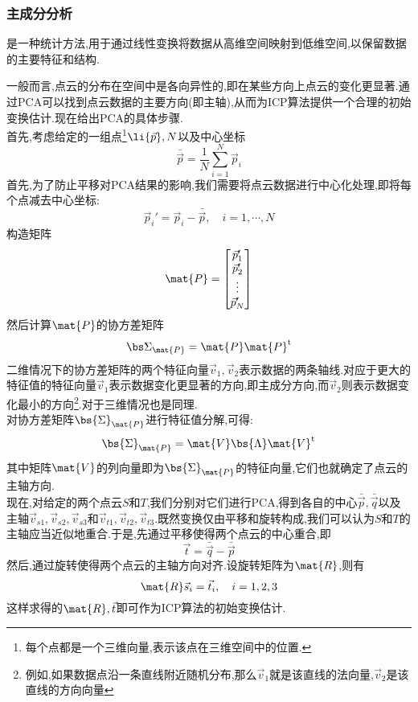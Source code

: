 \documentclass{ctexart}
\begin{document}
\subsubsection{主成分分析}
\begin{definition}[主成分分析]
    是一种统计方法,用于通过线性变换将数据从高维空间映射到低维空间,以保留数据的主要特征和结构.
\end{definition}
一般而言,点云的分布在空间中是各向异性的,即在某些方向上点云的变化更显著.通过PCA可以找到点云数据的主要方向(即主轴),从而为ICP算法提供一个合理的初始变换估计.现在给出PCA的具体步骤.\\
\indent 首先,考虑给定的一组点\footnote{每个点都是一个三维向量,表示该点在三维空间中的位置.}$\li{\vec p},N$以及中心坐标
\[\bar{\vec{p}}=\dfrac1N\sum_{i=1}^{N}\vec{p}_i\]
首先,为了防止平移对PCA结果的影响,我们需要将点云数据进行中心化处理,即将每个点减去中心坐标:
\[\vec{p}_i'=\vec{p}_i-\bar{\vec{p}},\quad i=1,\cdots,N\]
构造矩阵
\[\mat{P}=\begin{bmatrix}
    \vec{p}_1'\\\vec{p}_2'\\\vdots\\\vec{p}_N'
\end{bmatrix}\]
然后计算$\mat{P}$的协方差矩阵
\[\bs\Sigma_{\mat{P}}=\mat{P}\mat{P}^{\text{t}}\]
二维情况下的协方差矩阵的两个特征向量$\vec{v}_1,\vec{v}_2$表示数据的两条轴线.对应于更大的特征值的特征向量$\vec{v}_1$表示数据变化更显著的方向,即主成分方向,而$\vec{v}_2$则表示数据变化最小的方向\footnote{例如,如果数据点沿一条直线附近随机分布,那么$\vec{v}_1$就是该直线的法向量,$\vec{v}_2$是该直线的方向向量}.对于三维情况也是同理.\\
\indent 对协方差矩阵$\bs{\Sigma}_{\mat{P}}$进行特征值分解,可得:
\[\bs{\Sigma}_{\mat{P}}=\mat{V}\bs{\Lambda}\mat{V}^{\text{t}}\]
其中矩阵$\mat{V}$的列向量即为$\bs{\Sigma}_{\mat{P}}$的特征向量,它们也就确定了点云的主轴方向.\\
\indent 现在,对给定的两个点云$S$和$T$,我们分别对它们进行PCA,得到各自的中心$\bar{\vec{p}},\bar{\vec{q}}$以及主轴$\vec{v}_{s1},\vec{v}_{s2},\vec{v}_{s3}$和$\vec{v}_{t1},\vec{v}_{t2},\vec{v}_{t3}$.既然变换仅由平移和旋转构成,我们可以认为$S$和$T$的主轴应当近似地重合.于是,先通过平移使得两个点云的中心重合,即
\[\vec{t}=\bar{\vec{q}}-\bar{\vec{p}}\]
然后,通过旋转使得两个点云的主轴方向对齐.设旋转矩阵为$\mat{R}$,则有
\[\mat{R}\vec{s}_i=\vec{t}_i,\quad i=1,2,3\]
这样求得的$\mat{R},\vec{t}$即可作为ICP算法的初始变换估计.
\end{document}
